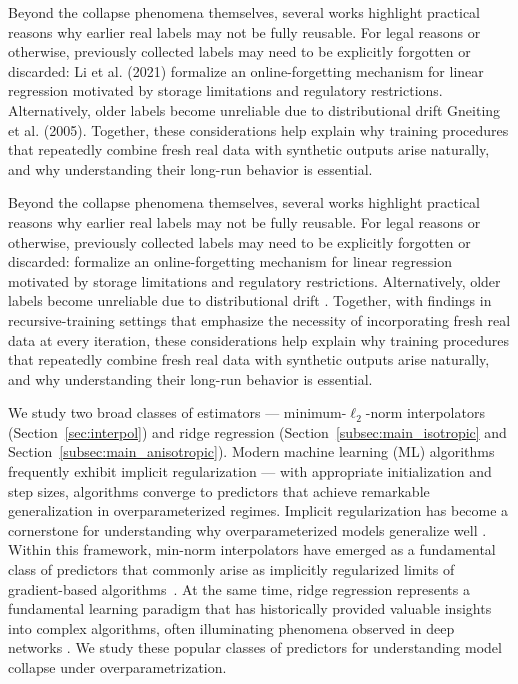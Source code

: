 \documentclass[10pt]{article}
\numberwithin{thm}{section}
\numberwithin{remark}{section}
\numberwithin{ex}{section}
\numberwithin{ass}{section}
\numberwithin{defn}{section}
\numberwithin{lemma}{section}
\numberwithin{corollary}{section}
\numberwithin{prop}{section}
\numberwithin{equation}{section}
\begin{document}
Beyond the collapse phenomena themselves, several works highlight practical reasons why earlier real labels may not be fully reusable.
For legal reasons or otherwise, previously collected labels may need to be explicitly forgotten or discarded: Li et al. (2021) formalize an online-forgetting mechanism for linear regression motivated by storage limitations and regulatory restrictions.
Alternatively, older labels become unreliable due to distributional drift Gneiting et al. (2005).
Together, these considerations help explain why training procedures that repeatedly combine fresh real data with synthetic outputs arise naturally, and why understanding their long-run behavior is essential.

Beyond the collapse phenomena themselves, several works highlight practical reasons why earlier real labels  may not be fully reusable.
For legal reasons or otherwise, previously collected labels may need to be explicitly forgotten or discarded: \cite{li2020online} formalize an online-forgetting mechanism for linear regression motivated by storage limitations and regulatory restrictions. Alternatively, older labels become unreliable due to distributional drift \cite{gneiting2005calibrated}.
Together, with findings in recursive-training settings \cite{alemohammad2024self} that emphasize the necessity of incorporating fresh real data at every iteration, these considerations help explain why training procedures that repeatedly combine fresh real data with synthetic outputs arise naturally, and why understanding their long-run behavior is essential.

We study two broad classes of estimators --- minimum-$\ell_2$-norm interpolators (Section~\ref{sec:interpol}) and ridge regression (Section~\ref{subsec:main_isotropic} and Section~\ref{subsec:main_anisotropic}).
Modern machine learning (ML) algorithms frequently exhibit implicit regularization \cite{zhang2005boosting, soudry2018implicit,gunasekar2018characterizing} --- with appropriate initialization and step sizes, algorithms converge to predictors that achieve remarkable generalization in overparameterized regimes. Implicit regularization has become a cornerstone for understanding why overparameterized models generalize well \cite{bartlett2020benign}. Within this framework, min-norm interpolators have emerged as a fundamental class of predictors that commonly arise as implicitly regularized limits of gradient-based algorithms~\cite{bartlett2020benign,deng2022model,gunasekar2018characterizing,gunasekar2018implicit,liang2022precise,montanari2019generalization,muthukumar2020harmless,soudry2018implicit,zhang2005boosting,wang2022tight,zhou2022non}.  At the same time, ridge regression represents a fundamental learning paradigm that has historically provided valuable insights into complex algorithms, often illuminating phenomena observed in deep networks \cite{hastie2022surprises,patiloptimal}. We study these popular classes of predictors for understanding model collapse under overparametrization.
\end{document}
